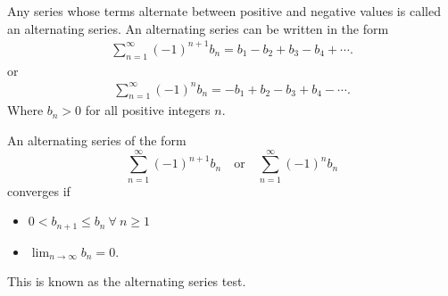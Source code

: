 \documentclass{report}
\begin{document}
   \bigbreak \noindent 
   \begin{definition}
      Any series whose terms alternate between positive and negative values is called an alternating series. An alternating series can be written in the form 
      \begin{align*}
          \sum_{n=1}^{\infty} (-1)^{n+1} b_n = b_1 - b_2 + b_3 - b_4 + \cdots
      .\end{align*}
      or
      \begin{align*}
          \sum_{n=1}^{\infty} (-1)^n b_n = -b_1 + b_2 - b_3 + b_4 - \cdots
      .\end{align*}
      Where  $b_n > 0$  for all positive integers $n$.

   \end{definition}
   \bigbreak \noindent 
   \begin{thrm}
       An alternating series of the form
        \[
        \sum_{n=1}^{\infty} (-1)^{n+1} b_n \quad \text{or} \quad \sum_{n=1}^{\infty} (-1)^n b_n
        \]
        converges if
        \begin{itemize}
            
            \item $0 < b_{n+1} \leq b_n\ \forall\ n \geq 1$
            \item $\lim_{n \to \infty} b_n = 0.$
    \end{itemize}

    This is known as the alternating series test.
   \end{thrm}
   
   

   

    
 




    


    

        
\end{document}

